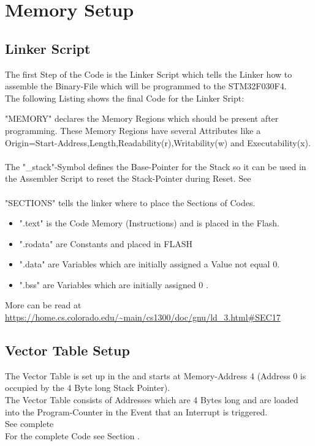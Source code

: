 \section{Memory Setup}

\subsection{Linker Script}

\label{sec:LinkerScript}

The first Step of the Code is the Linker Script which tells the Linker how to
assemble the Binary-File which will be programmed to the STM32F030F4.\\
The following Listing shows the final Code for the Linker Sript:



\hspace{-15px}"MEMORY" declares the Memory Regions which should be present after programming.
These Memory Regions have several Attributes like a Origin=Start-Address,Length,Readability(r),Writability(w) and Executability(x).\\ \\
The "\_stack"-Symbol defines the Base-Pointer for the Stack so it can be used in the Assembler Script to reset the Stack-Pointer during Reset. See \\ \\
"SECTIONS" tells the linker where to place the Sections of Codes.
\begin{itemize}
	\item ".text" is the Code Memory (Instructions) and is placed in the Flash.
	\item ".rodata" are Constants and placed in FLASH
	\item ".data" are Variables which are initially assigned a Value not equal 0.
	\item ".bss" are Variables which are initially assigned 0 .
\end{itemize}
More can be read at \\ \url{https://home.cs.colorado.edu/~main/cs1300/doc/gnu/ld_3.html#SEC17}

\pagebreak

\subsection{Vector Table Setup}
\label{sec:VecTabSetup}

The Vector Table is set up in the  and starts at Memory-Address 4 (Address 0 is occupied by the 4 Byte long Stack Pointer).\\
The Vector Table consists of Addresses which are 4 Bytes long and are loaded into the Program-Counter in the Event that an Interrupt is triggered.\\
See complete \\
For the complete Code see Section .



\pagebreak
